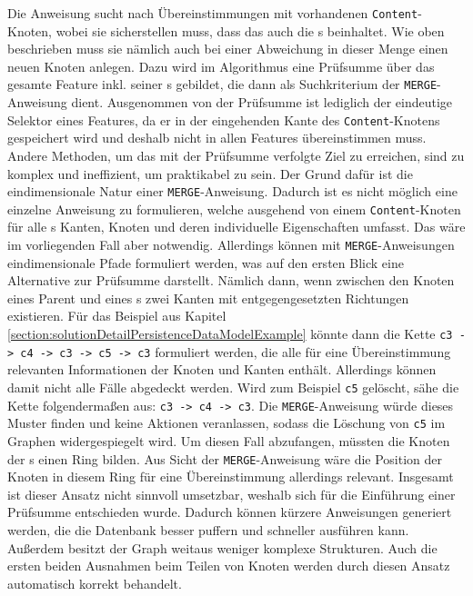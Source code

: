     Die Anweisung sucht nach Übereinstimmungen mit vorhandenen \texttt{Content}-Knoten,
    wobei sie sicherstellen muss, dass das auch die {\childFeature}s beinhaltet.
    Wie oben beschrieben muss sie nämlich auch bei einer Abweichung in dieser Menge einen neuen Knoten anlegen.
    Dazu wird im Algorithmus  eine Prüfsumme über das gesamte Feature inkl. seiner {\childFeature}s gebildet,
    die dann als Suchkriterium der \texttt{MERGE}-Anweisung dient.
    Ausgenommen von der Prüfsumme ist lediglich der eindeutige Selektor eines Features,
    da er in der eingehenden Kante des \texttt{Content}-Knotens gespeichert wird
    und deshalb nicht in allen Features übereinstimmen muss.
    Andere Methoden, um das mit der Prüfsumme verfolgte Ziel zu erreichen,
    sind zu komplex und ineffizient, um praktikabel zu sein.
    Der Grund dafür ist die eindimensionale Natur einer \texttt{MERGE}-Anweisung.
    Dadurch ist es nicht möglich eine einzelne Anweisung zu formulieren,
    welche ausgehend von einem \texttt{Content}-Knoten für alle {\childFeature}s
    Kanten, Knoten und deren individuelle Eigenschaften umfasst.
    Das wäre im vorliegenden Fall aber notwendig.
    Allerdings können mit \texttt{MERGE}-Anweisungen eindimensionale Pfade formuliert werden,
    was auf den ersten Blick eine Alternative zur Prüfsumme darstellt.
    Nämlich dann, wenn zwischen den Knoten eines Parent und eines {\childFeature}s
    zwei Kanten mit entgegengesetzten Richtungen existieren.
    Für das Beispiel aus Kapitel \ref{section:solutionDetailPersistenceDataModelExample} könnte dann
    die Kette \texttt{c3 -> c4 -> c3 -> c5 -> c3} formuliert werden,
    die alle für eine Übereinstimmung relevanten Informationen der Knoten und Kanten enthält.
    Allerdings können damit nicht alle Fälle abgedeckt werden.
    Wird zum Beispiel \texttt{c5} gelöscht, sähe die Kette folgendermaßen aus:
    \texttt{c3 -> c4 -> c3}.
    Die \texttt{MERGE}-Anweisung würde dieses Muster finden und keine Aktionen veranlassen,
    sodass die Löschung von \texttt{c5} im Graphen widergespiegelt wird.
    Um diesen Fall abzufangen, müssten die Knoten der {\childFeature}s einen Ring bilden.
    Aus Sicht der \texttt{MERGE}-Anweisung wäre die Position der Knoten in diesem Ring
    für eine Übereinstimmung allerdings relevant.
    Insgesamt ist dieser Ansatz nicht sinnvoll umsetzbar,
    weshalb sich für die Einführung einer Prüfsumme entschieden wurde.
    Dadurch können kürzere Anweisungen generiert werden, die die Datenbank besser puffern
    und schneller ausführen kann.
    Außerdem besitzt der Graph weitaus weniger komplexe Strukturen.
    Auch die ersten beiden Ausnahmen beim Teilen von Knoten werden durch diesen Ansatz
    automatisch korrekt behandelt.

